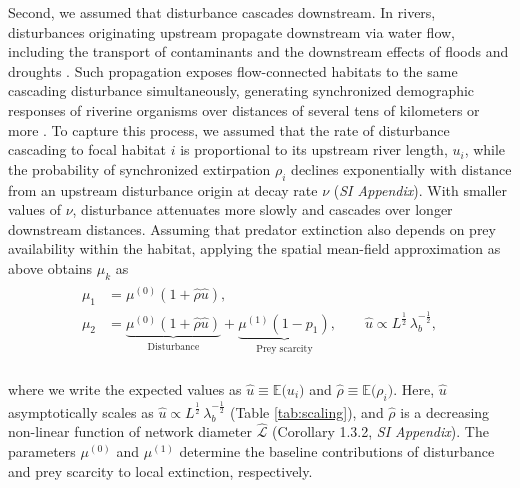 \documentclass[9pt,twocolumn,twoside]{pnas-new}
\begin{document}
Second, we assumed that disturbance cascades downstream. 
In rivers, disturbances originating upstream propagate downstream via water flow, including the transport of contaminants and the downstream effects of floods and droughts \citep{massoudieh_biogeochemical_2010, stanley_ecosystem_1997, swanson_flood_1998, nakamura_disturbance_2000, gomi_understanding_2002, messager_global_2021}.
Such propagation exposes flow-connected habitats to the same cascading disturbance simultaneously, generating synchronized demographic responses of riverine organisms over distances of several tens of kilometers or more \citep{larsen_geography_2021, sarremejane_drought_2021, tamario_barriers_2025, terui_metapopulation_2018}. 
To capture this process, we assumed that the rate of disturbance cascading to focal habitat $i$ is proportional to its upstream river length, $u_i$, while the probability of synchronized extirpation $\rho_i$ declines exponentially with distance from an upstream disturbance origin at decay rate $\nu$ (\textit{SI Appendix}).
With smaller values of $\nu$, disturbance attenuates more slowly and cascades over longer downstream distances.
Assuming that predator extinction also depends on prey availability within the habitat, applying the spatial mean-field approximation as above obtains $\mu_k$ as
\\
\begin{align}
    \begin{split}
        \mu_1 
        &= 
        \mu^{(0)}(1 + \hat{\rho} \hat{u}),\\
        \mu_2 
        &= 
        \underbrace{\mu^{(0)}(1 + \hat{\rho} \hat{u})}_{\text{Disturbance}} + \underbrace{\mu^{(1)} (1 - p_{1})}_{\text{Prey scarcity}},
        \qquad 
        \hat{u} 
        \propto 
        L^{\frac{1}{2}}\,\lambda_b^{-\frac{1}{2}},
    \end{split}
\label{eq:mu-pp}
\end{align}
\\
where we write the expected values as $\hat{u} \equiv \mathbb{E}\bigl(u_i\bigr)$ and $\hat{\rho} \equiv \mathbb{E}\bigl(\rho_i\bigr)$. 
Here, $\hat{u}$ asymptotically scales as $\hat{u} \propto L^{\frac{1}{2}}\,\lambda_b^{-\frac{1}{2}}$ (Table \ref{tab:scaling}), and $\hat{\rho}$ is a decreasing non-linear function of network diameter $\hat{\mathcal{L}}$ (Corollary 1.3.2, \textit{SI Appendix}).
The parameters $\mu^{(0)}$ and $\mu^{(1)}$ determine the baseline contributions of disturbance and prey scarcity to local extinction, respectively.
\end{document}
